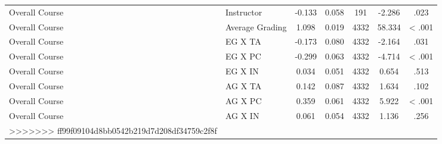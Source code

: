\documentclass[,man]{apa6}
\theoremstyle{definition}
\theoremstyle{definition}
\theoremstyle{definition}
\theoremstyle{remark}
\begin{document}
\begin{table}[tbp]
\begin{center}
\begin{threeparttable}
{\begin{tabular}{llccccc}
Overall Course & Instructor & -0.133 & 0.058 & 191 & -2.286 & .023\\
Overall Course & Average Grading & 1.098 & 0.019 & 4332 & 58.334 & < .001\\
Overall Course & EG X TA & -0.173 & 0.080 & 4332 & -2.164 & .031\\
Overall Course & EG X PC & -0.299 & 0.063 & 4332 & -4.714 & < .001\\
Overall Course & EG X IN & 0.034 & 0.051 & 4332 & 0.654 & .513\\
Overall Course & AG X TA & 0.142 & 0.087 & 4332 & 1.634 & .102\\
Overall Course & AG X PC & 0.359 & 0.061 & 4332 & 5.922 & < .001\\
Overall Course & AG X IN & 0.061 & 0.054 & 4332 & 1.136 & .256\\
>>>>>>> ff99f09104d8bb0542b219d7d208df34759c2f8f
\bottomrule
\end{tabular}
}
\end{threeparttable}
\end{center}
\end{table}
\end{document}
